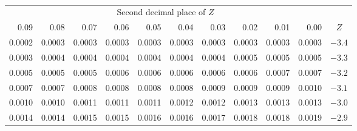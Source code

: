 \begin{table}[p]
\begin{center}{\small
{} \vspace{2mm} \\
\begin{tabular}{| rrrrr | rrrrr | c}
  \cline{1-10}
&&& \multicolumn{4}{c}{Second decimal place of $Z$} &&& \\
  \cline{1-10}
0.09 &  0.08 &  0.07 &  0.06 &  0.05 &  0.04 &  0.03 &  0.02 &  0.01 &  0.00 & $Z$  \\
  \hline
  \hline
\footnotesize{0.0002} & \footnotesize{0.0003} & \footnotesize{0.0003} & \footnotesize{0.0003} & \footnotesize{0.0003} & \footnotesize{0.0003} & \footnotesize{0.0003} & \footnotesize{0.0003} & \footnotesize{0.0003} & \footnotesize{0.0003} & $-3.4$ \\
  \footnotesize{0.0003} & \footnotesize{0.0004} & \footnotesize{0.0004} & \footnotesize{0.0004} & \footnotesize{0.0004} & \footnotesize{0.0004} & \footnotesize{0.0004} & \footnotesize{0.0005} & \footnotesize{0.0005} & \footnotesize{0.0005} & $-3.3$ \\
  \footnotesize{0.0005} & \footnotesize{0.0005} & \footnotesize{0.0005} & \footnotesize{0.0006} & \footnotesize{0.0006} & \footnotesize{0.0006} & \footnotesize{0.0006} & \footnotesize{0.0006} & \footnotesize{0.0007} & \footnotesize{0.0007} & $-3.2$ \\
  \footnotesize{0.0007} & \footnotesize{0.0007} & \footnotesize{0.0008} & \footnotesize{0.0008} & \footnotesize{0.0008} & \footnotesize{0.0008} & \footnotesize{0.0009} & \footnotesize{0.0009} & \footnotesize{0.0009} & \footnotesize{0.0010} & $-3.1$ \\
  \footnotesize{0.0010} & \footnotesize{0.0010} & \footnotesize{0.0011} & \footnotesize{0.0011} & \footnotesize{0.0011} & \footnotesize{0.0012} & \footnotesize{0.0012} & \footnotesize{0.0013} & \footnotesize{0.0013} & \footnotesize{0.0013} & $-3.0$ \\
    \hline
    \hline
  \footnotesize{0.0014} & \footnotesize{0.0014} & \footnotesize{0.0015} & \footnotesize{0.0015} & \footnotesize{0.0016} & \footnotesize{0.0016} & \footnotesize{0.0017} & \footnotesize{0.0018} & \footnotesize{0.0018} & \footnotesize{0.0019} & $-2.9$ \\

\end{tabular}}
\end{center}
\end{table}
